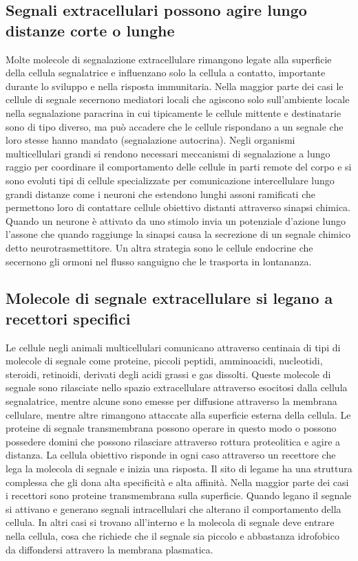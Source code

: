 \subsection{Segnali extracellulari possono agire lungo distanze corte o lunghe}
Molte molecole di segnalazione extracellulare rimangono legate alla superficie della cellula segnalatrice e influenzano solo la cellula a contatto, importante durante lo sviluppo e 
nella risposta immunitaria. Nella maggior parte dei casi le cellule di segnale secernono mediatori locali che agiscono solo sull'ambiente locale nella segnalazione paracrina in cui
tipicamente le cellule mittente e destinatarie sono di tipo diverso, ma pu\`o accadere che le cellule rispondano a un segnale che loro stesse hanno mandato (segnalazione autocrina).
Negli organismi multicellulari grandi si rendono necessari meccanismi di segnalazione a lungo raggio per coordinare il comportamento delle cellule in parti remote del corpo e si sono
evoluti tipi di cellule specializzate per comunicazione intercellulare lungo grandi distanze come i neuroni che estendono lunghi assoni ramificati che permettono loro di contattare
cellule obiettivo distanti attraverso sinapsi chimica. Quando un neurone \`e attivato da uno stimolo invia un potenziale d'azione lungo l'assone che quando raggiunge la sinapsi 
causa la secrezione di un segnale chimico detto neurotrasmettitore. Un altra strategia sono le cellule endocrine che secernono gli ormoni nel flusso sanguigno che le trasporta in
lontananza. 
\subsection{Molecole di segnale extracellulare si legano a recettori specifici}
Le cellule negli animali multicellulari comunicano attraverso centinaia di tipi di molecole di segnale come proteine, piccoli peptidi, amminoacidi, nucleotidi, steroidi, retinoidi, 
derivati degli acidi grassi e gas dissolti. Queste molecole di segnale sono rilasciate nello spazio extracellulare attraverso esocitosi dalla cellula segnalatrice, mentre alcune sono
emesse per diffusione attraverso la membrana cellulare, mentre altre rimangono attaccate alla superficie esterna della cellula. Le proteine di segnale transmembrana possono operare in
questo modo o possono possedere domini che possono rilasciare attraverso rottura proteolitica e agire a distanza. La cellula obiettivo risponde in ogni caso attraverso un recettore che 
lega la molecola di segnale e inizia una risposta. Il sito di legame ha una struttura complessa che gli dona alta specificit\`a e alta affinit\`a. Nella maggior parte dei casi i 
recettori sono proteine transmembrana sulla superficie. Quando legano il segnale si attivano e generano segnali intracellulari che alterano il comportamento della cellula. In 
altri casi si trovano all'interno e la molecola di segnale deve entrare nella cellula, cosa che richiede che il segnale sia piccolo e abbastanza idrofobico da diffondersi attravero 
la membrana plasmatica. 
